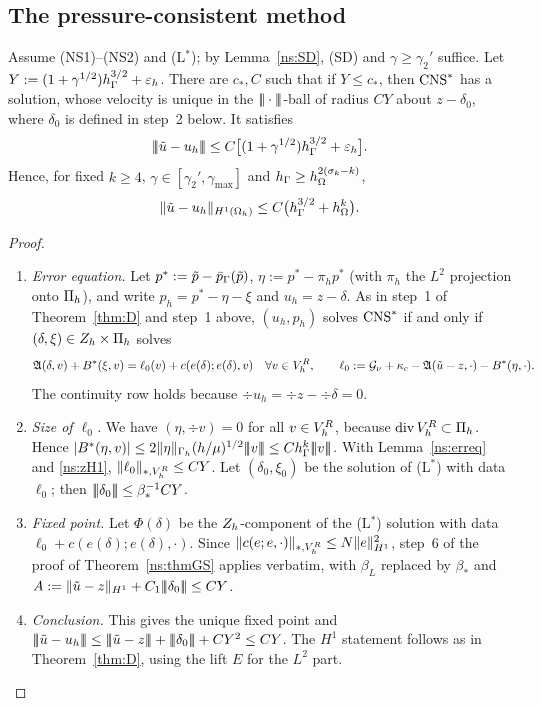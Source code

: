 \subsection{The pressure-consistent method}

\begin{theorem}\label{ns:thmD}
Assume (NS1)--(NS2) and (L$^\ast$); by Lemma~\ref{ns:SD}, (SD) and $\gamma\ge\gamma_2'$ suffice. Let $Y:=(1+\gamma^{1/2})h_\Gamma^{3/2}+\varepsilon_h$. There are $c_\ast,C$ such that if $Y\le c_\ast$, then $\mathrm{CNS}^\ast$ has a solution, whose velocity is unique in the $|\!|\!|\cdot|\!|\!|$-ball of radius $CY$ about $z-\delta_0$, where $\delta_0$ is defined in step~2 below. It satisfies
\[
|\!|\!|\tilde u-u_h|\!|\!|\le C\bigl[(1+\gamma^{1/2})h_\Gamma^{3/2}+\varepsilon_h\bigr].
\]
Hence, for fixed $k\ge4$, $\gamma\in[\gamma_2',\gamma_{\max}]$ and $h_\Gamma\ge h_\Omega^{2(\sigma_k-k)}$,
\[
\lVert \tilde u-u_h\rVert_{H^1(\Omega_h)}\le C\bigl(h_\Gamma^{3/2}+h_\Omega^k\bigr).
\]
\end{theorem}

\begin{proof}
\begin{enumerate}
\item \emph{Error equation.} Let $p^\ast:=\tilde p-\bar p_{\Gamma}(\tilde p)$, $\eta:=p^\ast-\pi_hp^\ast$ (with $\pi_h$ the $L^2$ projection onto $\Pi_h$), and write $p_h=p^\ast-\eta-\xi$ and $u_h=z-\delta$. As in step~1 of Theorem~\ref{thm:D} and step~1 above, $(u_h,p_h)$ solves $\mathrm{CNS}^\ast$ if and only if $(\delta,\xi)\in Z_h\times\Pi_h$ solves
\[
\mathfrak A(\delta,v)+B^\ast(\xi,v)=\ell_0(v)+c(e(\delta);e(\delta),v)\quad\forall v\in V_h^R,
\qquad \ell_0:=\mathcal G_\nu+\kappa_c-\mathfrak A(\tilde u-z,\cdot)-B^\ast(\eta,\cdot).
\]
The continuity row holds because $\div u_h=\div z-\div\delta=0$.
\item \emph{Size of $\ell_0$.} We have $(\eta,\div v)=0$ for all $v\in V_h^R$, because $\operatorname{div}V_h^R\subset\Pi_h$. Hence $|B^\ast(\eta,v)|\le2\norm\eta_{\Gh}(h/\mu)^{1/2}\tnorm v\le C\hG^k\tnorm v$. With Lemma~\ref{ns:erreq} and \eqref{ns:zH1}, $\lVert \ell_0\rVert_{\ast,V_h^R}\le CY$. Let $(\delta_0,\xi_0)$ be the solution of (L$^\ast$) with data $\ell_0$; then $|\!|\!|\delta_0|\!|\!|\le\beta_\ast^{-1}CY$.
\item \emph{Fixed point.} Let $\Phi(\delta)$ be the $Z_h$-component of the (L$^\ast$) solution with data $\ell_0+c(e(\delta);e(\delta),\cdot)$. Since $\lVert c(e;e,\cdot)\rVert_{\ast,V_h^R}\le N\lVert e\rVert_{H^1}^2$, step~6 of the proof of Theorem~\ref{ns:thmGS} applies verbatim, with $\beta_L$ replaced by $\beta_\ast$ and $A:=\lVert \tilde u-z\rVert_{H^1}+C_1|\!|\!|\delta_0|\!|\!|\le CY$.
\item \emph{Conclusion.} This gives the unique fixed point and $\tnorm{\ut-u_h}\le\tnorm{\ut-z}+\tnorm{\delta_0}+CY^2\le CY$. The $H^1$ statement follows as in Theorem~\ref{thm:D}, using the lift $E$ for the $L^2$ part.\qedhere
\end{enumerate}
\end{proof}

